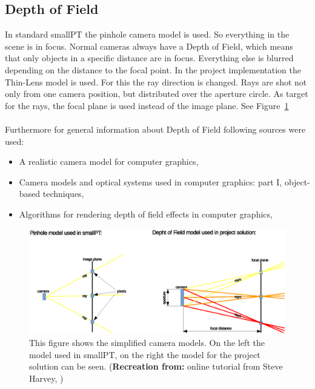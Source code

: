 \documentclass[11pt,a4paper]{article}
\begin{document}
\subsection{Depth of Field}
In standard smallPT the pinhole camera model is used. So everything in the scene is in focus. Normal cameras always have a Depth of Field, which means that only objects in a specific distance are in focus. Everything else is blurred depending on the distance to the focal point. In the project implementation the Thin-Lens model is used. For this the ray direction is changed. Rays are shot not only from one camera position, but distributed over the aperture circle. As target for the rays, the focal plane is used instead of the image plane. See Figure~\ref{fig:1}
\\
\\
Furthermore for general information about Depth of Field following sources were used:
\begin{itemize}
\item
A realistic camera model for computer graphics, \cite{kolb1995realistic}
\item
Camera models and optical systems used in computer graphics: part I, object-based techniques, \cite{barsky2003camera}
\item
Algorithms for rendering depth of field effects in computer graphics, \cite{barsky2008algorithms}

\end{itemize}

\begin{figure}[h]
\begin{center}
\includegraphics[trim=40 30 60 60, clip=true, scale=0.6]{images/pinholeVsDepthOfField}
\caption[Pinhole implementation vs Thin Lens implementation]{This figure shows the simplified camera models. On the left the model used in smallPT, on the right the model for the project solution can be seen. (\textbf{Recreation from:} online tutorial from Steve Harvey, \cite{link:Harvey})}
\label{fig:1}
\end{center}
\end{figure}
\end{document}
